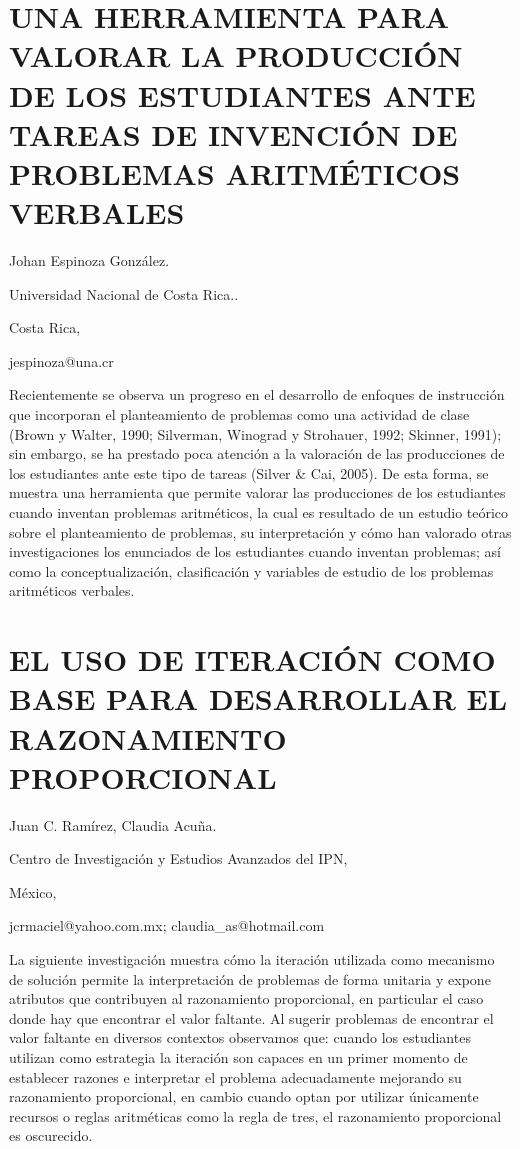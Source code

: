 \section{UNA HERRAMIENTA PARA VALORAR LA PRODUCCIÓN DE LOS ESTUDIANTES ANTE
TAREAS DE INVENCIÓN DE PROBLEMAS ARITMÉTICOS VERBALES }

\begin{datos}

Johan Espinoza González.

Universidad Nacional de Costa Rica..

Costa Rica,

jespinoza@una.cr 

\end{datos}

Recientemente se observa un progreso en el desarrollo de enfoques
de instrucción que incorporan el planteamiento de problemas como una
actividad de clase (Brown y Walter, 1990; Silverman, Winograd y Strohauer,
1992; Skinner, 1991); sin embargo, se ha prestado poca atención a
la valoración de las producciones de los estudiantes ante este tipo
de tareas (Silver \& Cai, 2005). De esta forma, se muestra una herramienta
que permite valorar las producciones de los estudiantes cuando inventan
problemas aritméticos, la cual es resultado de un estudio teórico
sobre el planteamiento de problemas, su interpretación y cómo han
valorado otras investigaciones los enunciados de los estudiantes cuando
inventan problemas; así como la conceptualización, clasificación y
variables de estudio de los problemas aritméticos verbales. 


\section{EL USO DE ITERACIÓN COMO BASE PARA DESARROLLAR EL RAZONAMIENTO PROPORCIONAL}

\begin{datos}

Juan C. Ramírez, Claudia Acuña.

Centro de Investigación y Estudios Avanzados del IPN,

México,

jcrmaciel@yahoo.com.mx; claudia\_as@hotmail.com

\end{datos}

La siguiente investigación muestra cómo la iteración utilizada como
mecanismo de solución permite la interpretación de problemas de forma
unitaria y expone atributos que contribuyen al razonamiento proporcional,
en particular el caso donde hay que encontrar el valor faltante. Al
sugerir problemas de encontrar el valor faltante en diversos contextos
observamos que: cuando los estudiantes utilizan como estrategia la
iteración son capaces en un primer momento de establecer razones e
interpretar el problema adecuadamente mejorando su razonamiento proporcional,
en cambio cuando optan por utilizar únicamente recursos o reglas aritméticas
como la regla de tres, el razonamiento proporcional es oscurecido.


